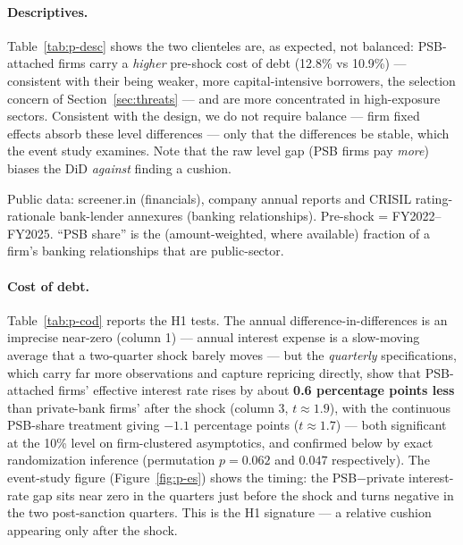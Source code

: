 \documentclass[12pt]{article}
\begin{document}
\paragraph{Descriptives.} Table~\ref{tab:p-desc} shows the two clienteles are, as expected,
not balanced: PSB-attached firms carry a \emph{higher} pre-shock cost of debt (12.8\% vs
10.9\%) --- consistent with their being weaker, more capital-intensive borrowers, the
selection concern of Section~\ref{sec:threats} --- and are more concentrated in high-exposure
sectors. Consistent with the design, we do not require balance --- firm fixed effects absorb
these level differences --- only that the differences be stable, which the event study
examines. Note that the raw level gap (PSB firms pay \emph{more}) biases the DiD
\emph{against} finding a cushion.

\begin{table}[t]
\centering
\begin{threeparttable}
\caption{Pilot sample: descriptive statistics by pre-shock banking clientele}
\label{tab:p-desc}
\small

\begin{tablenotes}\footnotesize
\item Public data: screener.in (financials), company annual reports and CRISIL rating-rationale
bank-lender annexures (banking relationships). Pre-shock = FY2022--FY2025. ``PSB share'' is the
(amount-weighted, where available) fraction of a firm's banking relationships that are public-sector.
\end{tablenotes}
\end{threeparttable}
\end{table}

\paragraph{Cost of debt.} Table~\ref{tab:p-cod} reports the H1 tests. The annual
difference-in-differences is an imprecise near-zero (column 1) --- annual interest expense
is a slow-moving average that a two-quarter shock barely moves --- but the \emph{quarterly}
specifications, which carry far more observations and capture repricing directly, show that
PSB-attached firms' effective interest rate rises by about \textbf{0.6 percentage points
less} than private-bank firms' after the shock (column 3, $t\approx1.9$), with the continuous
PSB-share treatment giving $-1.1$ percentage points ($t\approx1.7$) --- both significant at
the 10\% level on firm-clustered asymptotics, and confirmed below by exact randomization
inference (permutation $p=0.062$ and $0.047$ respectively). The event-study figure
(Figure~\ref{fig:p-es}) shows the timing: the
PSB$-$private interest-rate gap sits near zero in the quarters just before the shock and
turns negative in the two post-sanction quarters. This is the H1 signature --- a relative
cushion appearing only after the shock.
\end{document}

